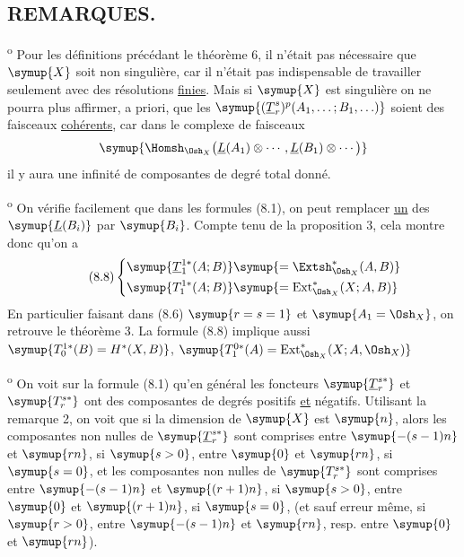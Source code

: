 \subsection*{\normalfont REMARQUES.}

\textsuperscript{o} Pour les définitions précédant le théorème 6,
il n'était pas nécessaire que $\symup{X}$ soit non singulière, car il n'était pas
indispensable de travailler seulement avec des résolutions \uline{finies}. Mais si $\symup{X}$
est singulière on ne pourra plus affirmer, a priori, que les
$\symup{(\underline{T}_{r}^{s})^{p}(A_1,\ldots;B_1,\ldots)}$ soient des faisceaux
\uline{cohérents}, car dans le complexe de faisceaux
\[
  \symup{\Homsh_{\Osh_X}\bigl(\underline{L}(A_1)\otimes\cdots,\underline{L}(B_1)\otimes\cdots\bigr)}
\]
il y aura une infinité de composantes de degré total donné.

\medskip
{}\textsuperscript{o} On vérifie facilement que dans les formules
(8.1), on peut remplacer \uline{un} des $\symup{\underline{L}(B_i)}$ par $\symup{B_i}$. Compte tenu de la
proposition 3, cela montre donc qu'on a
\begin{equation}\tag{8.8}
\left\{
\begin{aligned}\symup{\underline{T}_{1}^{1*}(A;B)}&\symup{=\Extsh_{\Osh_X}^{*}(A,B)}\\\symup{T_{1}^{1*}(A;B)}&\symup{=\operatorname{Ext}_{\Osh_X}^{*}(X;A,B)}\end{aligned}
\right.
\end{equation}
En particulier faisant dans (8.6) $\symup{r=s=1}$ et $\symup{A_1=\Osh_X}$, on retrouve le
théorème 3. La formule (8.8) implique aussi
$\symup{T_{0}^{1*}(B)=H^{*}(X,B)}$, $\symup{T_{1}^{0*}(A)=\operatorname{Ext}_{\Osh_X}^{*}(X;A,\Osh_X)}$

\medskip
{}\textsuperscript{o} On voit sur la formule (8.1) qu'en général les
foncteurs $\symup{\underline{T}_{r}^{s*}}$ et $\symup{T_{r}^{s*}}$ ont des composantes de
degrés positifs \uline{et} négatifs. Utilisant la remarque 2, on voit que si la
dimension de $\symup{X}$ est $\symup{n}$, alors les composantes non nulles de
$\symup{\underline{T}_{r}^{s*}}$ sont comprises entre $\symup{-(s-1)n}$ et $\symup{rn}$, si $\symup{s>0}$,
entre $\symup{0}$ et $\symup{rn}$, si $\symup{s=0}$, et les composantes non nulles de $\symup{T_{r}^{s*}}$
sont comprises entre $\symup{-(s-1)n}$ et $\symup{(r+1)n}$, si $\symup{s>0}$, entre $\symup{0}$ et $\symup{(r+1)n}$,
si $\symup{s=0}$, (et sauf erreur même, si $\symup{r>0}$, entre $\symup{-(s-1)n}$ et $\symup{rn}$, resp. entre
$\symup{0}$ et $\symup{rn}$).

